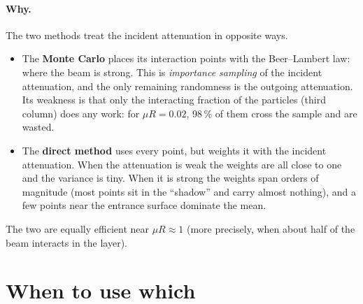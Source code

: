 \paragraph{Why.} The two methods treat the incident attenuation in opposite ways.
\begin{itemize}
  \item The \textbf{Monte Carlo} places its interaction points with the Beer--Lambert law: where the beam is strong. This is \emph{importance
        sampling} of the incident attenuation, and the only remaining randomness is the outgoing attenuation. Its weakness is that only the
        interacting fraction of the particles (third column) does any work: for $\mu R=0.02$, 98\,\% of them cross the sample and are wasted.
  \item The \textbf{direct method} uses every point, but weights it with the incident attenuation. When the attenuation is weak the weights are all
        close to one and the variance is tiny. When it is strong the weights span orders of magnitude (most points sit in the ``shadow'' and carry
        almost nothing), and a few points near the entrance surface dominate the mean.
\end{itemize}
The two are equally efficient near $\mu R\approx1$ (more precisely, when about half of the beam interacts in the layer).

\section{When to use which}

